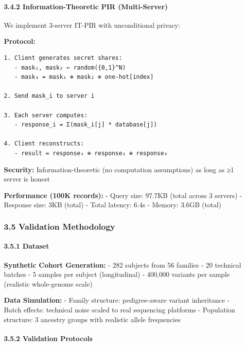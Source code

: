 \documentclass[
  11pt,
]{article}
\begin{document}
\paragraph{3.4.2 Information-Theoretic PIR
(Multi-Server)}\label{information-theoretic-pir-multi-server}

We implement 3-server IT-PIR with unconditional privacy:

\textbf{Protocol:}

\begin{verbatim}
1. Client generates secret shares:
   - mask₁, mask₂ ← random({0,1}^N)
   - mask₃ = mask₁ ⊕ mask₂ ⊕ one-hot[index]

2. Send mask_i to server i

3. Each server computes:
   - response_i = Σ(mask_i[j] * database[j])

4. Client reconstructs:
   - result = response₁ ⊕ response₂ ⊕ response₃
\end{verbatim}

\textbf{Security:} Information-theoretic (no computation assumptions) as
long as ≥1 server is honest

\textbf{Performance (100K records):} - Query size: 97.7KB (total across
3 servers) - Response size: 3KB (total) - Total latency: 6.4s - Memory:
3.6GB (total)

\subsubsection{3.5 Validation Methodology}\label{validation-methodology}

\paragraph{3.5.1 Dataset}\label{dataset}

\textbf{Synthetic Cohort Generation:} - 282 subjects from 56 families -
20 technical batches - 5 samples per subject (longitudinal) - 400,000
variants per sample (realistic whole-genome scale)

\textbf{Data Simulation:} - Family structure: pedigree-aware variant
inheritance - Batch effects: technical noise scaled to real sequencing
platforms - Population structure: 3 ancestry groups with realistic
allele frequencies

\paragraph{3.5.2 Validation Protocols}\label{validation-protocols}
\end{document}
